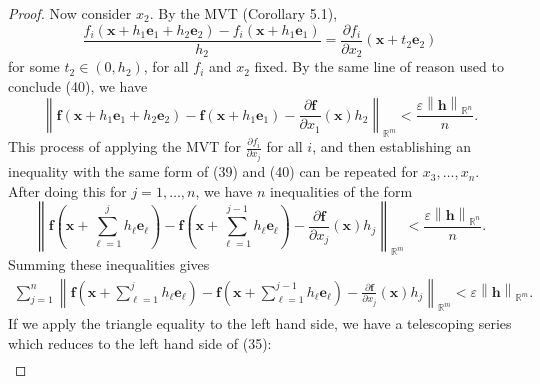 \documentclass{article}
\newcommand{\R}{\mathbb{R}}
\newcommand{\x}{\mathbf{x}}
\newcommand{\f}{\mathbf{f}}
\newcommand{\h}{\mathbf{h}}
\newcommand{\norm}[1]{\left\lVert#1\right\rVert}
\theoremstyle{definition}
\begin{document}
\begin{proof}
Now consider $ x_2 $. By the MVT (Corollary 5.1), \begin{equation*}\label{key}
	\frac{f_i(\x + h_1\mathbf e_1 +h_2\mathbf e_2 ) - f_i(\x+ h_1\mathbf e_1 )}{h_2} = \frac{\partial f_i}{\partial x_2}(\x + t_2\mathbf e_2)
\end{equation*}for some $ t_2 \in (0,h_2) $, for all $ f_i $ and $ x_2 $ fixed. By the same line of reason used to conclude (40), we have 
\begin{equation}\label{key}
	\norm{\f(\x + h_1\mathbf e_1 +  h_2\mathbf e_2) - \f(\x + h_1\mathbf e_1) - \frac{\partial \f}{\partial x_1}(\x)h_2}_{\R^m} < \frac{\varepsilon\norm{\h}_{\R^n}}{n}. 
\end{equation}
This process of applying the MVT for $ \frac{\partial f_i}{\partial x_j} $ for all $ i $, and then establishing an inequality with the same form of (39) and (40) can be repeated for $ x_3,\ldots,x_n $. After doing this for $ j=1,\ldots, n $, we have $ n $ inequalities of the form
\begin{equation*}\label{key}
	\norm{\f\left(\x + \textstyle\sum_{\ell=1}^j h_\ell \mathbf e_\ell\right) - \f\left(\x + \textstyle\sum_{\ell=1}^{j-1} h_\ell \mathbf e_\ell\right) - \frac{\partial \f}{\partial x_j}(\x)h_j}_{\R^m} < \frac{\varepsilon\norm{\h}_{\R^n}}{n}.  
\end{equation*}
Summing these inequalities gives
\begin{align} \sum_{j=1}^{n}\norm{\f\left(\x + \textstyle\sum_{\ell=1}^j h_\ell \mathbf e_\ell\right) - \f\left(\x + \textstyle\sum_{\ell=1}^{j-1} h_\ell \mathbf e_\ell\right) - \frac{\partial \f}{\partial x_j}(\x)h_j}_{\R^m}  < \varepsilon\norm{\h}_{\R^m}.
\end{align}
If we apply the triangle equality to the left hand side, we have a telescoping series which reduces to the left hand side of (35): {\tiny
\begin{align*}

\end{align*}}
\end{proof}
\end{document}
